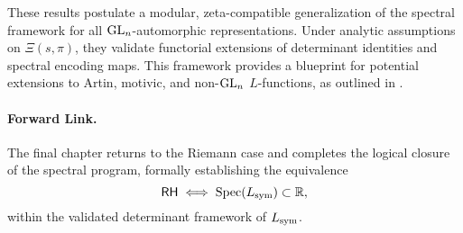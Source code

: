 \medskip

These results postulate a modular, zeta-compatible generalization of the spectral framework for all \( \mathrm{GL}_n \)-automorphic representations. Under analytic assumptions on \( \Xi(s, \pi) \), they validate functorial extensions of determinant identities and spectral encoding maps. This framework provides a blueprint for potential extensions to Artin, motivic, and non-\( \mathrm{GL}_n \) \( L \)-functions, as outlined in .

\paragraph{Forward Link.}
The final chapter returns to the Riemann case and completes the logical closure of the spectral program, formally establishing the equivalence
\[
\mathsf{RH} \iff \operatorname{Spec}(L_{\mathrm{sym}}) \subset \mathbb{R},
\]
within the validated determinant framework of \( L_{\mathrm{sym}} \).
